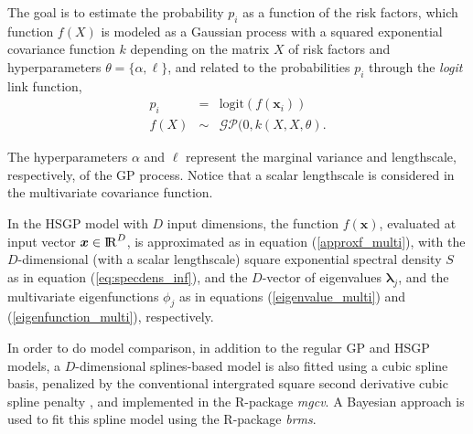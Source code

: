 \documentclass[]{interact}
\theoremstyle{plain}%
\theoremstyle{definition}
\theoremstyle{remark}
\begin{document}
\noindent The goal is to estimate the 
 probability $p_i$ as a function of the risk factors, which function $f(X)$ is modeled as a Gaussian process with a squared exponential covariance function $k$ depending on the matrix $X$ of risk factors and hyperparameters $\theta=\{\alpha,\ell\}$, and related to the probabilities $p_i$ through the {\it logit} link function,
%
\begin{eqnarray*} \label{eq:gpprior_gay}
p_i &=& \text{logit}(f(\bm{x}_i)) \nonumber \\
f(X) &\sim& \mathcal{GP}(0, k(X,X, \theta).
\end{eqnarray*}

\noindent The hyperparameters $\alpha$ and $\ell$ represent the marginal variance and lengthscale, respectively, of the GP process. Notice that a scalar lengthscale is considered in the multivariate covariance function.

In the HSGP model with $D$ input dimensions, the function $f(\bm{x})$, evaluated at input vector $\bm{x} \in {\rm I\!R}^D$, is approximated as in equation (\ref{approxf_multi}), with the $D$-dimensional (with a scalar lengthscale) square exponential spectral density $S$ as in equation (\ref{eq:specdens_inf}), and the $D$-vector of eigenvalues $\bm{\lambda}_j$, and the multivariate eigenfunctions $\phi_j$ as in equations (\ref{eigenvalue_multi}) and (\ref{eigenfunction_multi}), respectively.


In order to do model comparison, in addition to the regular GP and HSGP models, a $D$-dimensional splines-based model is also fitted using a cubic spline basis, penalized by the conventional intergrated square second derivative cubic spline penalty \citep{wood2017generalized}, and implemented in the R-package \textit{mgcv}. A Bayesian approach is used to fit this spline model using the R-package \textit{brms}.
\end{document}
